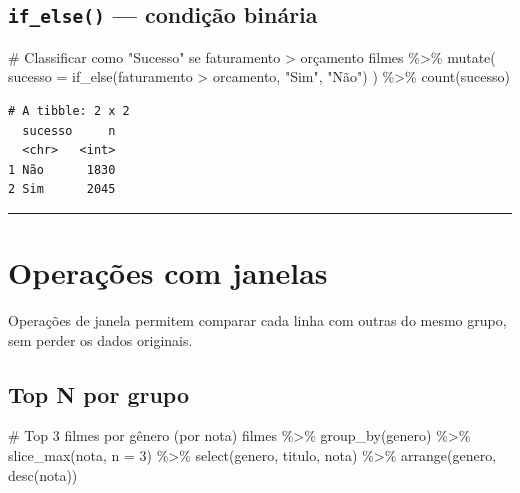 \documentclass[
  letterpaper,
]{scrbook}
\newenvironment{Shaded}{\begin{snugshade}}{\end{snugshade}}
\newcommand{\AttributeTok}[1]{\textcolor[rgb]{0.40,0.45,0.13}{#1}}
\newcommand{\CommentTok}[1]{\textcolor[rgb]{0.37,0.37,0.37}{#1}}
\newcommand{\DecValTok}[1]{\textcolor[rgb]{0.68,0.00,0.00}{#1}}
\newcommand{\FunctionTok}[1]{\textcolor[rgb]{0.28,0.35,0.67}{#1}}
\newcommand{\NormalTok}[1]{\textcolor[rgb]{0.00,0.23,0.31}{#1}}
\newcommand{\SpecialCharTok}[1]{\textcolor[rgb]{0.37,0.37,0.37}{#1}}
\newcommand{\StringTok}[1]{\textcolor[rgb]{0.13,0.47,0.30}{#1}}
\begin{document}
\subsection{\texorpdfstring{\texttt{if\_else()} --- condição
binária}{if\_else() --- condição binária}}\label{if_else-condiuxe7uxe3o-binuxe1ria}

\begin{Shaded}
\begin{Highlighting}[]
\CommentTok{\# Classificar como "Sucesso" se faturamento \textgreater{} orçamento}
\NormalTok{filmes }\SpecialCharTok{\%\textgreater{}\%} 
  \FunctionTok{mutate}\NormalTok{(}
    \AttributeTok{sucesso =} \FunctionTok{if\_else}\NormalTok{(faturamento }\SpecialCharTok{\textgreater{}}\NormalTok{ orcamento, }\StringTok{"Sim"}\NormalTok{, }\StringTok{"Não"}\NormalTok{)}
\NormalTok{  ) }\SpecialCharTok{\%\textgreater{}\%} 
  \FunctionTok{count}\NormalTok{(sucesso)}
\end{Highlighting}
\end{Shaded}

\begin{verbatim}
# A tibble: 2 x 2
  sucesso     n
  <chr>   <int>
1 Não      1830
2 Sim      2045
\end{verbatim}

\begin{center}\rule{0.5\linewidth}{0.5pt}\end{center}

\section{Operações com janelas}\label{operauxe7uxf5es-com-janelas}

Operações de janela permitem comparar cada linha com outras do mesmo
grupo, sem perder os dados originais.

\subsection{Top N por grupo}\label{top-n-por-grupo}

\begin{Shaded}
\begin{Highlighting}[]
\CommentTok{\# Top 3 filmes por gênero (por nota)}
\NormalTok{filmes }\SpecialCharTok{\%\textgreater{}\%} 
  \FunctionTok{group\_by}\NormalTok{(genero) }\SpecialCharTok{\%\textgreater{}\%} 
  \FunctionTok{slice\_max}\NormalTok{(nota, }\AttributeTok{n =} \DecValTok{3}\NormalTok{) }\SpecialCharTok{\%\textgreater{}\%} 
  \FunctionTok{select}\NormalTok{(genero, titulo, nota) }\SpecialCharTok{\%\textgreater{}\%} 
  \FunctionTok{arrange}\NormalTok{(genero, }\FunctionTok{desc}\NormalTok{(nota))}
\end{Highlighting}
\end{Shaded}
\end{document}
